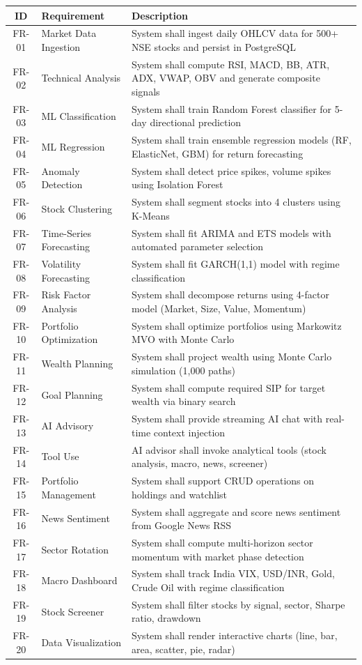 \documentclass[12pt, a4paper, oneside]{report}
\begin{document}
\begin{longtable}{@{}c p{4cm} p{8cm}@{}}
\toprule
\textbf{ID} & \textbf{Requirement} & \textbf{Description} \\
\midrule
\endhead
FR-01 & Market Data Ingestion & System shall ingest daily OHLCV data for 500+ NSE stocks and persist in PostgreSQL \\
FR-02 & Technical Analysis & System shall compute RSI, MACD, BB, ATR, ADX, VWAP, OBV and generate composite signals \\
FR-03 & ML Classification & System shall train Random Forest classifier for 5-day directional prediction \\
FR-04 & ML Regression & System shall train ensemble regression models (RF, ElasticNet, GBM) for return forecasting \\
FR-05 & Anomaly Detection & System shall detect price spikes, volume spikes using Isolation Forest \\
FR-06 & Stock Clustering & System shall segment stocks into 4 clusters using K-Means \\
FR-07 & Time-Series Forecasting & System shall fit ARIMA and ETS models with automated parameter selection \\
FR-08 & Volatility Forecasting & System shall fit GARCH(1,1) model with regime classification \\
FR-09 & Risk Factor Analysis & System shall decompose returns using 4-factor model (Market, Size, Value, Momentum) \\
FR-10 & Portfolio Optimization & System shall optimize portfolios using Markowitz MVO with Monte Carlo \\
FR-11 & Wealth Planning & System shall project wealth using Monte Carlo simulation (1,000 paths) \\
FR-12 & Goal Planning & System shall compute required SIP for target wealth via binary search \\
FR-13 & AI Advisory & System shall provide streaming AI chat with real-time context injection \\
FR-14 & Tool Use & AI advisor shall invoke analytical tools (stock analysis, macro, news, screener) \\
FR-15 & Portfolio Management & System shall support CRUD operations on holdings and watchlist \\
FR-16 & News Sentiment & System shall aggregate and score news sentiment from Google News RSS \\
FR-17 & Sector Rotation & System shall compute multi-horizon sector momentum with market phase detection \\
FR-18 & Macro Dashboard & System shall track India VIX, USD/INR, Gold, Crude Oil with regime classification \\
FR-19 & Stock Screener & System shall filter stocks by signal, sector, Sharpe ratio, drawdown \\
FR-20 & Data Visualization & System shall render interactive charts (line, bar, area, scatter, pie, radar) \\
\bottomrule
\end{longtable}
\end{document}
